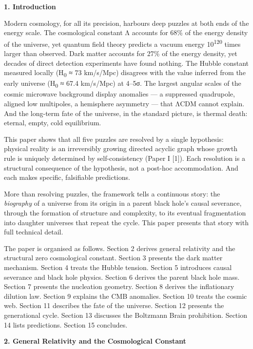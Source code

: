 \documentclass[12pt,a4paper]{article}
\begin{document}
\textbf{1. Introduction}

Modern cosmology, for all its precision, harbours deep puzzles at both
ends of the energy scale. The cosmological constant Λ accounts for 68\%
of the energy density of the universe, yet quantum field theory predicts
a vacuum energy 10\textsuperscript{120} times larger than observed. Dark
matter accounts for 27\% of the energy density, yet decades of direct
detection experiments have found nothing. The Hubble constant measured
locally (H\textsubscript{0} ≈ 73 km/s/Mpc) disagrees with the value
inferred from the early universe (H\textsubscript{0} ≈ 67.4 km/s/Mpc) at
4--5σ. The largest angular scales of the cosmic microwave background
display anomalies --- a suppressed quadrupole, aligned low multipoles, a
hemisphere asymmetry --- that ΛCDM cannot explain. And the long-term
fate of the universe, in the standard picture, is thermal death:
eternal, empty, cold equilibrium.

This paper shows that all five puzzles are resolved by a single
hypothesis: physical reality is an irreversibly growing directed acyclic
graph whose growth rule is uniquely determined by self-consistency
(Paper I {[}1{]}). Each resolution is a structural consequence of the
hypothesis, not a post-hoc accommodation. And each makes specific,
falsifiable predictions.

More than resolving puzzles, the framework tells a continuous story: the
\emph{biography} of a universe from its origin in a parent black hole's
causal severance, through the formation of structure and complexity, to
its eventual fragmentation into daughter universes that repeat the
cycle. This paper presents that story with full technical detail.

The paper is organised as follows. Section 2 derives general relativity
and the structural zero cosmological constant. Section 3 presents the
dark matter mechanism. Section 4 treats the Hubble tension. Section 5
introduces causal severance and black hole physics. Section 6 derives
the parent black hole mass. Section 7 presents the nucleation geometry.
Section 8 derives the inflationary dilution law. Section 9 explains the
CMB anomalies. Section 10 treats the cosmic web. Section 11 describes
the fate of the universe. Section 12 presents the generational cycle.
Section 13 discusses the Boltzmann Brain prohibition. Section 14 lists
predictions. Section 15 concludes.

\textbf{2. General Relativity and the Cosmological Constant}
\end{document}
